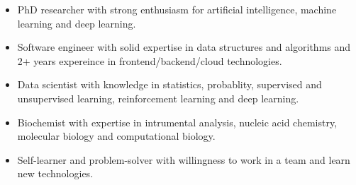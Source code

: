 

\begin{cvparagraph}

\begin{itemize}
\item PhD researcher with strong enthusiasm for artificial intelligence, machine learning and deep learning.
\item Software engineer with solid expertise in data structures and algorithms and 2+ years expereince in frontend/backend/cloud technologies.
\item Data scientist with knowledge in statistics, probablity, supervised and unsupervised learning, reinforcement learning and deep learning.
\item Biochemist with expertise in intrumental analysis, nucleic acid chemistry, molecular biology and computational biology.
\item Self-learner and problem-solver with willingness to work in a team and learn new technologies.
\end{itemize}
\end{cvparagraph}
